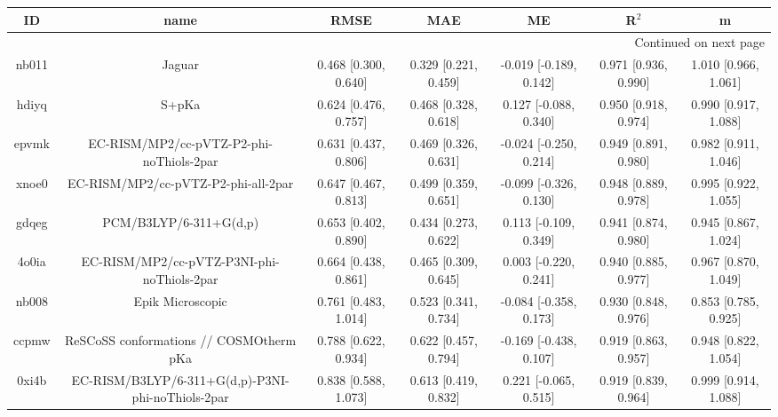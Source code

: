 \documentclass{article}
\begin{document}
\begin{center}
\begin{longtable}{|ccccccc|}
\toprule
    ID &                                               name &                  RMSE &                   MAE &                       ME &                 R$^2$ &                      m \\
\midrule
\endhead
\midrule
\multicolumn{7}{r}{{Continued on next page}} \\
\midrule
\endfoot

\bottomrule
\endlastfoot
 nb011 &                                             Jaguar &  0.468 [0.300, 0.640] &  0.329 [0.221, 0.459] &   -0.019 [-0.189, 0.142] &  0.971 [0.936, 0.990] &   1.010 [0.966, 1.061] \\
 hdiyq &                                              S+pKa &  0.624 [0.476, 0.757] &  0.468 [0.328, 0.618] &    0.127 [-0.088, 0.340] &  0.950 [0.918, 0.974] &   0.990 [0.917, 1.088] \\
 epvmk &           EC-RISM/MP2/cc-pVTZ-P2-phi-noThiols-2par &  0.631 [0.437, 0.806] &  0.469 [0.326, 0.631] &   -0.024 [-0.250, 0.214] &  0.949 [0.891, 0.980] &   0.982 [0.911, 1.046] \\
 xnoe0 &                EC-RISM/MP2/cc-pVTZ-P2-phi-all-2par &  0.647 [0.467, 0.813] &  0.499 [0.359, 0.651] &   -0.099 [-0.326, 0.130] &  0.948 [0.889, 0.978] &   0.995 [0.922, 1.055] \\
 gdqeg &                             PCM/B3LYP/6-311+G(d,p) &  0.653 [0.402, 0.890] &  0.434 [0.273, 0.622] &    0.113 [-0.109, 0.349] &  0.941 [0.874, 0.980] &   0.945 [0.867, 1.024] \\
 4o0ia &         EC-RISM/MP2/cc-pVTZ-P3NI-phi-noThiols-2par &  0.664 [0.438, 0.861] &  0.465 [0.309, 0.645] &    0.003 [-0.220, 0.241] &  0.940 [0.885, 0.977] &   0.967 [0.870, 1.049] \\
 nb008 &                                   Epik Microscopic &  0.761 [0.483, 1.014] &  0.523 [0.341, 0.734] &   -0.084 [-0.358, 0.173] &  0.930 [0.848, 0.976] &   0.853 [0.785, 0.925] \\
 ccpmw &            ReSCoSS conformations // COSMOtherm pKa &  0.788 [0.622, 0.934] &  0.622 [0.457, 0.794] &   -0.169 [-0.438, 0.107] &  0.919 [0.863, 0.957] &   0.948 [0.822, 1.054] \\
 0xi4b &  EC-RISM/B3LYP/6-311+G(d,p)-P3NI-phi-noThiols-2par &  0.838 [0.588, 1.073] &  0.613 [0.419, 0.832] &    0.221 [-0.065, 0.515] &  0.919 [0.839, 0.964] &   0.999 [0.914, 1.088] \\

\end{longtable}
\end{center}
\end{document}
